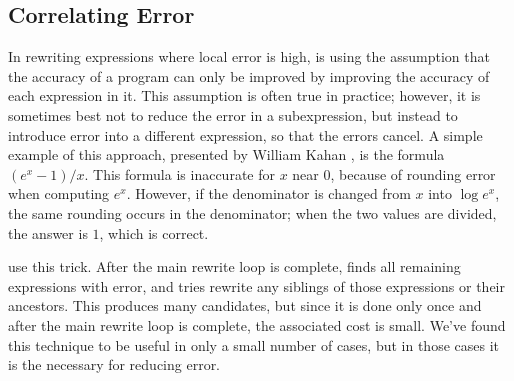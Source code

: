 \documentclass[paper.tex]{subfiles}
\begin{document}
\subsection{Correlating Error}

In rewriting expressions where local error is high,
  \casio is using the assumption
  that the accuracy of a program can only be improved
  by improving the accuracy of each expression in it.
This assumption is often true in practice;
  however, it is sometimes best not to reduce the error in a subexpression,
  but instead to introduce error into a different expression,
  so that the errors cancel.
A simple example of this approach,
  presented by William Kahan ,
  is the formula $(e^x - 1) / x$.
This formula is inaccurate for $x$ near $0$,
  because of rounding error when computing $e^x$.
However, if the denominator is changed from $x$ into $\log e^x$,
  the same rounding occurs in the denominator;
  when the two values are divided, the answer is $1$, which is correct.

\casio use this trick.
After the main rewrite loop is complete,
  \casio finds all remaining expressions with error,
  and tries rewrite any siblings of those expressions or their ancestors.
This produces many candidates, but since it is done only once
  and after the main rewrite loop is complete, the associated cost is small.
We've found this technique to be useful in only a small number of cases,
  but in those cases it is the necessary for reducing error.
\end{document}

